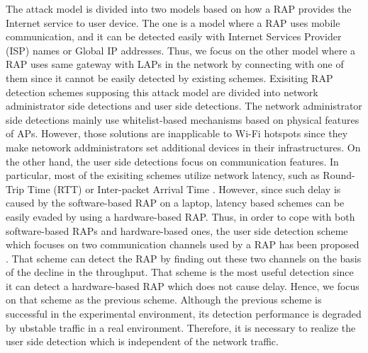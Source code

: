 \documentclass[conference]{IEEEtran}
\begin{document}
The attack model is divided into two models based on how a RAP provides the Internet service to user device.
The one is a model where a RAP uses mobile communication, and it can be detected easily with Internet Services Provider (ISP) names or Global IP addresses\cite{rtt}.
Thus, we focus on the other model where a RAP uses same gateway with LAPs in the network by connecting with one of them since it cannot be easily detected by existing schemes.
Exisiting RAP detection schemes supposing this attack model are divided into network administrator side detections and user side detections.
The network administrator side detections mainly use whitelist-based mechanisms based on physical features of APs\cite{prapd}\cite{clockskew}.
However, those solutions are inapplicable to Wi-Fi hotspots since they make netowork addministrators set additional devices in their infrastructures.
On the other hand, the user side detections focus on communication features.
In particular, most of the exisiting schemes utilize network latency, such as Round-Trip Time (RTT) or Inter-packet Arrival Time \cite{rtt}\cite{iat}.
However, since such delay is caused by the software-based RAP on a laptop, latency based schemes can be easily evaded by using a hardware-based RAP.
Thus, in order to cope with both software-based RAPs and hardware-based ones, the user side detection scheme which focuses on two communication channels used by a RAP has been proposed \cite{previous}.
That scheme can detect the RAP by finding out these two channels on the basis of the decline in the throughput.
That scheme is the most useful detection since it can detect a hardware-based RAP which does not cause delay.
Hence, we focus on that scheme \cite{previous} as the previous scheme.
Although the previous scheme is successful in the experimental environment, its detection performance is degraded by ubstable traffic in a real environment.
Therefore, it is necessary to realize the user side detection which is independent of the network traffic.
\end{document}
